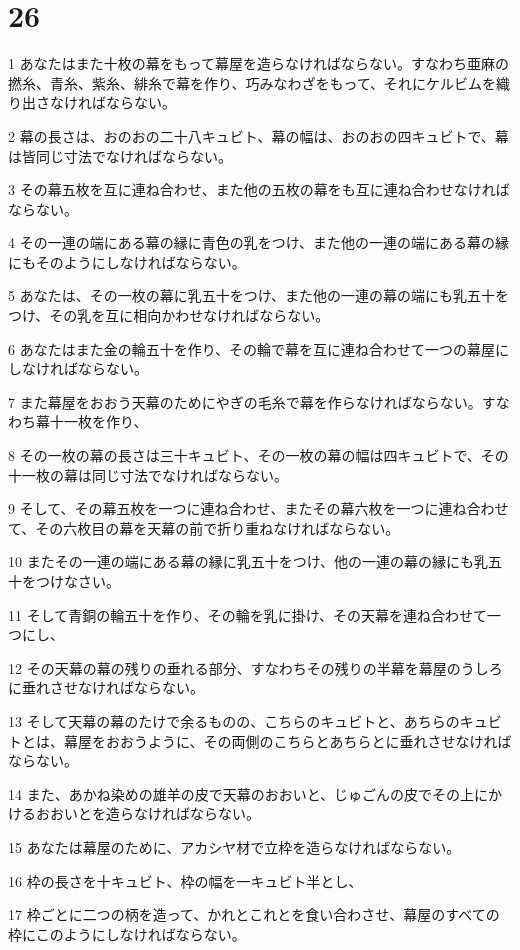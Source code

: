 \chapter{26}

\par 1 あなたはまた十枚の幕をもって幕屋を造らなければならない。すなわち亜麻の撚糸、青糸、紫糸、緋糸で幕を作り、巧みなわざをもって、それにケルビムを織り出さなければならない。
\par 2 幕の長さは、おのおの二十八キュビト、幕の幅は、おのおの四キュビトで、幕は皆同じ寸法でなければならない。
\par 3 その幕五枚を互に連ね合わせ、また他の五枚の幕をも互に連ね合わせなければならない。
\par 4 その一連の端にある幕の縁に青色の乳をつけ、また他の一連の端にある幕の縁にもそのようにしなければならない。
\par 5 あなたは、その一枚の幕に乳五十をつけ、また他の一連の幕の端にも乳五十をつけ、その乳を互に相向かわせなければならない。
\par 6 あなたはまた金の輪五十を作り、その輪で幕を互に連ね合わせて一つの幕屋にしなければならない。
\par 7 また幕屋をおおう天幕のためにやぎの毛糸で幕を作らなければならない。すなわち幕十一枚を作り、
\par 8 その一枚の幕の長さは三十キュビト、その一枚の幕の幅は四キュビトで、その十一枚の幕は同じ寸法でなければならない。
\par 9 そして、その幕五枚を一つに連ね合わせ、またその幕六枚を一つに連ね合わせて、その六枚目の幕を天幕の前で折り重ねなければならない。
\par 10 またその一連の端にある幕の縁に乳五十をつけ、他の一連の幕の縁にも乳五十をつけなさい。
\par 11 そして青銅の輪五十を作り、その輪を乳に掛け、その天幕を連ね合わせて一つにし、
\par 12 その天幕の幕の残りの垂れる部分、すなわちその残りの半幕を幕屋のうしろに垂れさせなければならない。
\par 13 そして天幕の幕のたけで余るものの、こちらのキュビトと、あちらのキュビトとは、幕屋をおおうように、その両側のこちらとあちらとに垂れさせなければならない。
\par 14 また、あかね染めの雄羊の皮で天幕のおおいと、じゅごんの皮でその上にかけるおおいとを造らなければならない。
\par 15 あなたは幕屋のために、アカシヤ材で立枠を造らなければならない。
\par 16 枠の長さを十キュビト、枠の幅を一キュビト半とし、
\par 17 枠ごとに二つの柄を造って、かれとこれとを食い合わさせ、幕屋のすべての枠にこのようにしなければならない。
